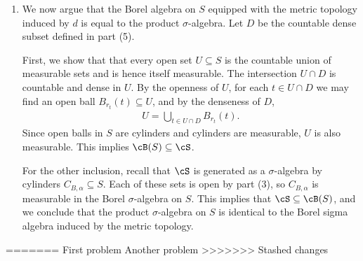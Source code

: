 \begin{homework}[e]
\begin{prf}
\begin{enumerate}[(1)]
			\item We now argue that the Borel algebra on $S$ equipped with the metric topology induced by $d$ is equal to the product $\sigma$-algebra. Let $D$ be the countable dense subset defined in part (5).

				First, we show that that every open set $U \subseteq S$ is the countable union of measurable sets and is hence itself measurable. The intersection $U \cap D$ is countable and dense in $U$. By the openness of $U$, for each $t \in U\cap D$ we may find an open ball $B_{r_t}(t) \subseteq U$, and by the denseness of $D$,
				\begin{align*}
					U = \bigcup_{t \in U\cap D} B_{r_t}(t).
				\end{align*}
				Since open balls in $S$ are cylinders and cylinders are measurable, $U$ is also measurable. This implies $\cB(S) \subseteq \cS$.

				For the other inclusion, recall that $\cS$ is generated as a $\sigma$-algebra by cylinders $C_{B,\alpha} \subseteq S$. Each of these sets is open by part (3), so $C_{B,\alpha}$ is measurable in the Borel $\sigma$-algebra on $S$. This implies that $\cS \subseteq \cB(S)$, and we conclude that the product $\sigma$-algebra on $S$ is identical to the Borel sigma algebra induced by the metric topology.
		\end{enumerate}
	\end{prf}
=======
	\prob First problem
	 Another problem
>>>>>>> Stashed changes
\end{homework}


